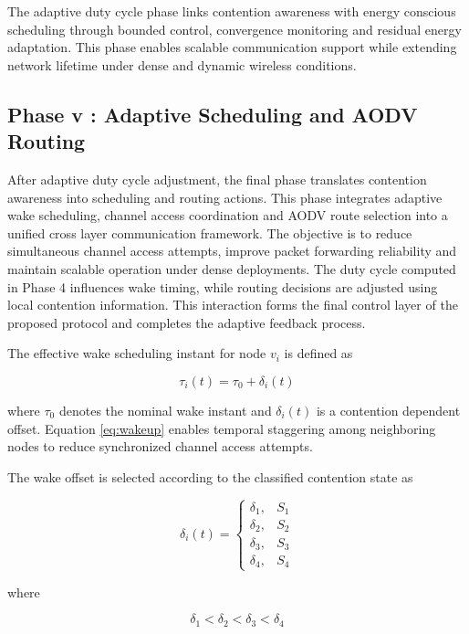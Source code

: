 \documentclass[a4paper,fleqn,final,1p]{cas-dc}
\numberwithin{equation}{section}
\begin{document}
The adaptive duty cycle phase links contention awareness with energy conscious scheduling through bounded control, convergence monitoring and residual energy adaptation. This phase enables scalable communication support while extending network lifetime under dense and dynamic wireless conditions.

\subsection{Phase v : Adaptive Scheduling and AODV Routing}

After adaptive duty cycle adjustment, the final phase translates contention awareness into scheduling and routing actions. This phase integrates adaptive wake scheduling, channel access coordination and AODV route selection into a unified cross layer communication framework. The objective is to reduce simultaneous channel access attempts, improve packet forwarding reliability and maintain scalable operation under dense deployments. The duty cycle computed in Phase 4 influences wake timing, while routing decisions are adjusted using local contention information. This interaction forms the final control layer of the proposed protocol and completes the adaptive feedback process.

The effective wake scheduling instant for node $v_i$ is defined as

\begin{equation}
\tau_i(t)=\tau_0+\delta_i(t)
\label{eq:wakeup}
\end{equation}

where $\tau_0$ denotes the nominal wake instant and $\delta_i(t)$ is a contention dependent offset. Equation \ref{eq:wakeup} enables temporal staggering among neighboring nodes to reduce synchronized channel access attempts.

The wake offset is selected according to the classified contention state as

\begin{equation}
\delta_i(t)=
\begin{cases}
\delta_1, & S_1 \\
\delta_2, & S_2 \\
\delta_3, & S_3 \\
\delta_4, & S_4
\end{cases}
\label{eq:offset}
\end{equation}

where

\begin{equation}
\delta_1<\delta_2<\delta_3<\delta_4
\label{eq:ordering}
\end{equation}
\end{document}

